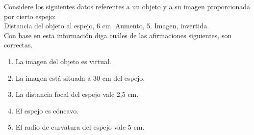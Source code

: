 
Considere los siguientes datos referentes a un objeto y a su imagen proporcionada por cierto espejo:\\
Distancia del objeto al espejo, 6 cm. Aumento, 5. Imagen, invertida.\\
Con base en esta información diga cuáles de las afirmaciones siguientes, son correctas.
\begin{enumerate}
    \item La imagen del objeto es virtual.
    \item La imagen está situada a 30 cm del espejo.
    \item La distancia focal del espejo vale 2,5 cm.
    \item El espejo es cóncavo.
    \item El radio de curvatura del espejo vale 5 cm.
\end{enumerate}